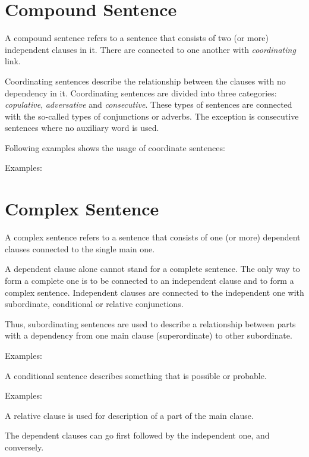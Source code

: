 \section{Compound Sentence}

A compound sentence refers to a sentence that consists of two (or more) independent clauses in it. There are connected to one another with \textit{coordinating} link.

Coordinating sentences describe the relationship between the clauses with no dependency in it. Coordinating sentences are divided into three categories: \textit{copulative}, \textit{adversative} and \textit{consecutive}. These types of sentences are connected with the so-called types of conjunctions or adverbs. The exception is consecutive sentences where no auxiliary word is used.
 
Following examples shows the usage of coordinate sentences:

Examples:



\section{Complex Sentence}

A complex sentence refers to a sentence that consists of one (or more) dependent clauses connected to the single main one.

A dependent clause alone cannot stand for a complete sentence. The only way to form a complete one is to be connected to an independent clause and to form a complex sentence. Independent clauses are connected to the independent one with subordinate, conditional or relative conjunctions.

Thus, subordinating sentences are used to describe a relationship between parts with a dependency from one main clause (superordinate) to other subordinate.

Examples:

A conditional sentence describes something that is possible or probable.

Examples:

A relative clause is used for description of a part of the main clause.

The dependent clauses can go first followed by the independent one, and conversely.

